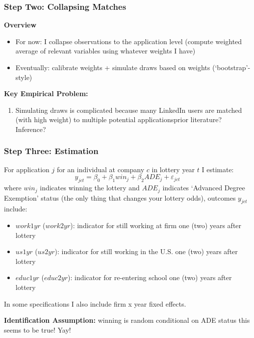 \documentclass[xcolor=dvipsnames, compress, 12pt, aspectratio=169, handout]{beamer}
\begin{document}
\begin{frame}
    \frametitle{Step Two: Collapsing Matches}
    \textbf{Overview}
    \begin{itemize}
        \item For now: I collapse observations to the application level (compute weighted average of relevant variables using whatever weights I have)
        \item Eventually: calibrate weights + simulate draws based on weights (`bootstrap'-style) 
    \end{itemize}
    \vspace{2mm}
    \textbf{Key Empirical Problem:}
    \begin{enumerate}
        \item Simulating draws is complicated because many LinkedIn users are matched (with high weight) to multiple potential applications\textemdash prior literature? Inference?
    \end{enumerate}
\end{frame}
\begin{frame}
    \frametitle{Step Three: Estimation}
    For application $j$ for an individual at company $c$ in lottery year $t$ I estimate:
    \begin{equation}
        y_{jct} = \beta_0 + \beta_1 win_j + \beta_2 ADE_j + \varepsilon_{jct}
    \end{equation}
    where $win_j$ indicates winning the lottery and $ADE_j$ indicates `Advanced Degree Exemption' status (the only thing that changes your lottery odds), outcomes $y_{jct}$ include:
    \begin{itemize}
        \item $work1yr$ ($work2yr$): indicator for still working at firm one (two) years after lottery
        \item $us1yr$ ($us2yr$): indicator for still working in the U.S. one (two) years after lottery
        \item $educ1yr$ ($educ2yr$): indicator for re-entering school one (two) years after lottery
    \end{itemize}
    In some specifications I also include firm x year fixed effects.

    \vspace{2mm}
    \textbf{Identification Assumption:} winning is random conditional on ADE status \textemdash this seems to be true! Yay!
\end{frame}
\end{document}
